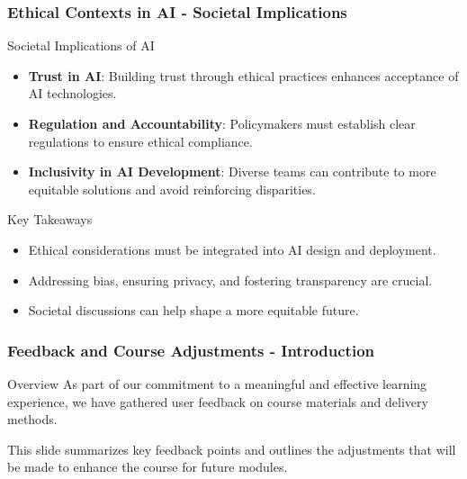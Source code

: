 \documentclass[aspectratio=169]{beamer}
\begin{document}
\begin{frame}[fragile]
    \frametitle{Ethical Contexts in AI - Societal Implications}
    \begin{block}{Societal Implications of AI}
        \begin{itemize}
            \item \textbf{Trust in AI}:
                Building trust through ethical practices enhances acceptance of AI technologies.
            
            \item \textbf{Regulation and Accountability}:
                Policymakers must establish clear regulations to ensure ethical compliance.
            
            \item \textbf{Inclusivity in AI Development}:
                Diverse teams can contribute to more equitable solutions and avoid reinforcing disparities.
        \end{itemize}
    \end{block}
    
    \begin{block}{Key Takeaways}
        \begin{itemize}
            \item Ethical considerations must be integrated into AI design and deployment.
            \item Addressing bias, ensuring privacy, and fostering transparency are crucial.
            \item Societal discussions can help shape a more equitable future.
        \end{itemize}
    \end{block}
\end{frame}

\begin{frame}[fragile]
    \frametitle{Feedback and Course Adjustments - Introduction}
    \begin{block}{Overview}
        As part of our commitment to a meaningful and effective learning experience, we have gathered user feedback on course materials and delivery methods.
    \end{block}
    This slide summarizes key feedback points and outlines the adjustments that will be made to enhance the course for future modules.
\end{frame}
\end{document}
